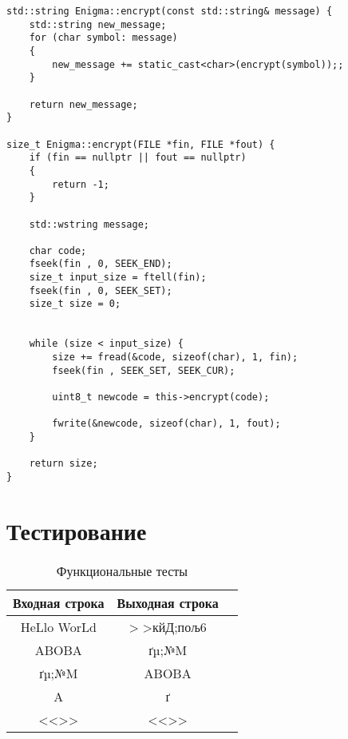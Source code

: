 \begin{lstlisting}[label=lst:enigma:reflactor,caption=Класс енигмы]
std::string Enigma::encrypt(const std::string& message) {
	std::string new_message;
	for (char symbol: message)
	{
		new_message += static_cast<char>(encrypt(symbol));;
	}
	
	return new_message;
}

size_t Enigma::encrypt(FILE *fin, FILE *fout) {
	if (fin == nullptr || fout == nullptr)
	{
		return -1;
	}
	
	std::wstring message;
	
	char code;
	fseek(fin , 0, SEEK_END);
	size_t input_size = ftell(fin);
	fseek(fin , 0, SEEK_SET);
	size_t size = 0;

	
	while (size < input_size) {
		size += fread(&code, sizeof(char), 1, fin);
		fseek(fin , SEEK_SET, SEEK_CUR);
		
		uint8_t newcode = this->encrypt(code);
		
		fwrite(&newcode, sizeof(char), 1, fout);
	}
	
	return size;
}
\end{lstlisting}

\section{Тестирование}

\begin{table}[ht!]
	\begin{center}
		\captionsetup{justification=raggedright,singlelinecheck=off}
		\caption{\label{tbl:functional_test} Функциональные тесты}
		\begin{tabular}{|c|c|c|}
			\hline
			Входная строка & Выходная строка \\ 
			\hline
			HeLlo WorLd & >>кйД;пољ6 \\
			ABOBA  & ґµ;№M\\
			ґµ;№M  & ABOBA \\
			A & ґ\\
			<<>>  & <<>>\\
			\hline
		\end{tabular}
	\end{center}
\end{table}